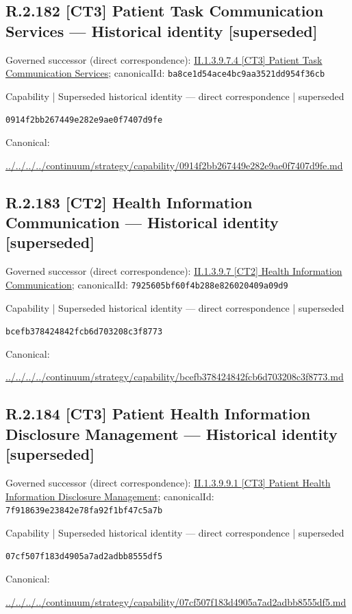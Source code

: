 \documentclass[10pt,a4paper]{article}
\begin{document}
\subsection*{R.2.182 [CT3] Patient Task Communication Services — Historical identity [superseded]}
Governed successor (direct correspondence): \hyperref[element-ba8ce1d54ace4bc9aa3521dd954f36cb]{II.1.3.9.7.4 [CT3] Patient Task Communication Services}; canonicalId: \texttt{ba8ce1d54ace4bc9aa3521dd954f36cb}\par
\label{element-0914f2bb267449e282e9ae0f7407d9fe}
{\small Capability | Superseded historical identity — direct correspondence | superseded}\par
\texttt{0914f2bb267449e282e9ae0f7407d9fe}\par
Canonical: \par
{\footnotesize\url{../../../../continuum/strategy/capability/0914f2bb267449e282e9ae0f7407d9fe.md}}\par
\subsection*{R.2.183 [CT2] Health Information Communication — Historical identity [superseded]}
Governed successor (direct correspondence): \hyperref[element-7925605bf60f4b288e826020409a09d9]{II.1.3.9.7 [CT2] Health Information Communication}; canonicalId: \texttt{7925605bf60f4b288e826020409a09d9}\par
\label{element-bcefb378424842fcb6d703208c3f8773}
{\small Capability | Superseded historical identity — direct correspondence | superseded}\par
\texttt{bcefb378424842fcb6d703208c3f8773}\par
Canonical: \par
{\footnotesize\url{../../../../continuum/strategy/capability/bcefb378424842fcb6d703208c3f8773.md}}\par
\subsection*{R.2.184 [CT3] Patient Health Information Disclosure Management — Historical identity [superseded]}
Governed successor (direct correspondence): \hyperref[element-7f918639e23842e78fa92f1bf47c5a7b]{II.1.3.9.9.1 [CT3] Patient Health Information Disclosure Management}; canonicalId: \texttt{7f918639e23842e78fa92f1bf47c5a7b}\par
\label{element-07cf507f183d4905a7ad2adbb8555df5}
{\small Capability | Superseded historical identity — direct correspondence | superseded}\par
\texttt{07cf507f183d4905a7ad2adbb8555df5}\par
Canonical: \par
{\footnotesize\url{../../../../continuum/strategy/capability/07cf507f183d4905a7ad2adbb8555df5.md}}\par
\end{document}
